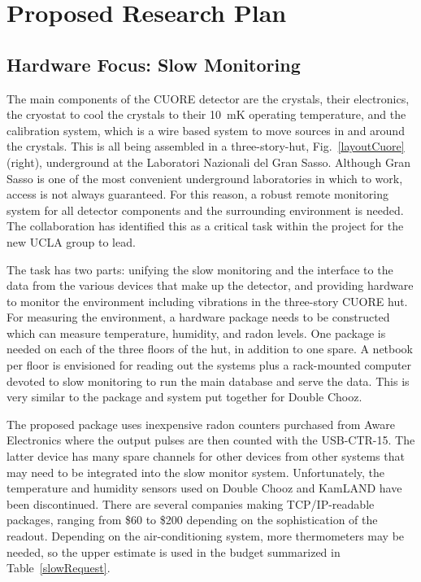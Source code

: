 \section{Proposed Research Plan}

\subsection{Hardware Focus: Slow Monitoring}
The main components of the CUORE detector are the crystals, their electronics, the cryostat to cool the crystals to their 10~mK operating temperature, and the calibration system, which is a wire based system to move sources in and around the crystals. This is all being assembled in a three-story-hut,  Fig.~\ref{layoutCuore} (right), underground at the Laboratori Nazionali del Gran Sasso. Although Gran Sasso is one of the most convenient underground laboratories in which to work, access is not always guaranteed. For this reason, a robust remote monitoring system for all detector components and the surrounding environment is needed. The collaboration has identified this as a critical task within the project for the new UCLA group to lead.

The task has two parts: unifying the slow monitoring and the interface to the data from the various devices that make up the detector, and providing hardware to monitor the environment including vibrations in the three-story CUORE hut. For measuring the environment, a hardware package needs to be constructed which can measure temperature, humidity, and radon levels.  One package is needed on each of the three floors of the hut, in addition to one spare. A netbook per floor is envisioned for reading out the systems plus a rack-mounted computer devoted to slow monitoring to run the main database and serve the data. This is very similar to the package and system put together for Double Chooz. 

The proposed package uses inexpensive radon counters purchased from Aware Electronics\cite{aware} where the output pulses are then counted with the USB-CTR-15\cite{usbctr}.  The latter device has many spare channels for other devices from other systems that may need to be integrated into the slow monitor system. Unfortunately, the temperature and humidity sensors used on Double Chooz and KamLAND have been discontinued. There are several companies making TCP/IP-readable packages, ranging from \$60 to \$200 depending on the sophistication of the readout. Depending on the air-conditioning system, more thermometers may be needed, so the upper estimate is used in the budget summarized in Table~\ref{slowRequest}. 

